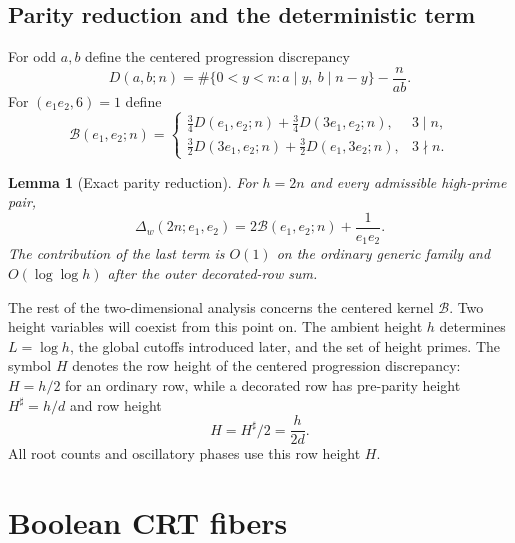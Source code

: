 \documentclass[11pt]{article}
\newtheorem{lemma}[lemma]{Lemma}
\theoremstyle{definition}
\theoremstyle{remark}
\newcommand{\Bcal}{\mathcal B}
\newcommand{\1}{\mathbf 1}
\newcommand{\llog}{\log\log}
\begin{document}
\subsection{Parity reduction and the deterministic term}\label{sec:parity}
For odd $a,b$ define the centered progression discrepancy
\begin{equation}\label{eq:D-def}
D(a,b;n)=\#\{0<y<n:a\mid y,\ b\mid n-y\}-\frac{n}{ab}.
\end{equation}
For $(e_1e_2,6)=1$ define
\begin{equation}\label{eq:B-def}
\Bcal(e_1,e_2;n)=
\begin{cases}
\frac34D(e_1,e_2;n)+\frac34D(3e_1,e_2;n),&3\mid n,\\[1mm]
\frac32D(3e_1,e_2;n)+\frac32D(e_1,3e_2;n),&3\nmid n.
\end{cases}
\end{equation}

\begin{lemma}[Exact parity reduction]\label{lem:parity-reduction}
For $h=2n$ and every admissible high-prime pair,
\begin{equation}\label{eq:parity-reduction}
\boxed{\Delta_w(2n;e_1,e_2)
 =2\Bcal(e_1,e_2;n)+\frac1{e_1e_2}.}
\end{equation}
The contribution of the last term is $O(1)$ on the ordinary generic family and $O(\llog h)$ after the outer decorated-row sum.
\end{lemma}

The rest of the two-dimensional analysis concerns the centered kernel $\Bcal$.  Two height variables will coexist from this point on.  The ambient height $h$ determines $L=\log h$, the global cutoffs introduced later, and the set of height primes.  The symbol $H$ denotes the row height of the centered progression discrepancy: $H=h/2$ for an ordinary row, while a decorated row has pre-parity height $H^\sharp=h/d$ and row height
\[
H=H^\sharp/2=\frac{h}{2d}.
\]
All root counts and oscillatory phases use this row height $H$.

\section{Boolean CRT fibers}\label{sec:boolean}
\end{document}
